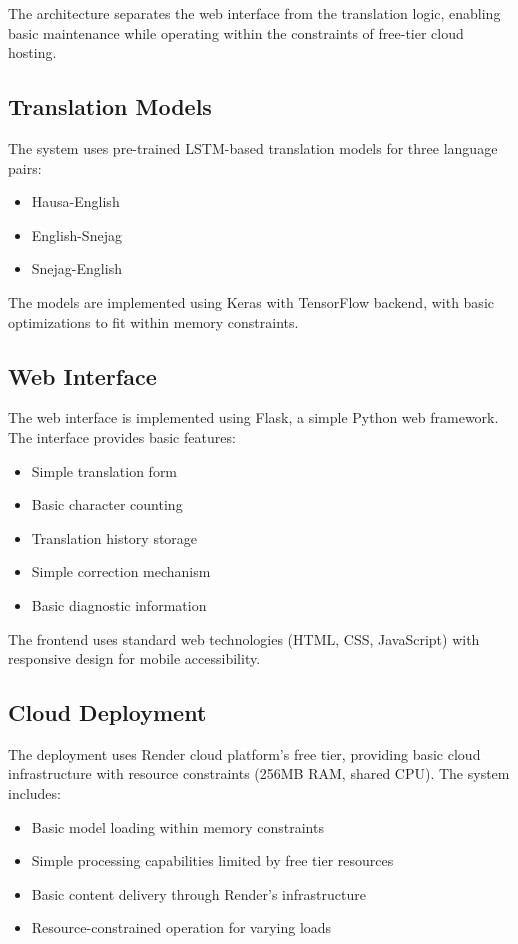 \documentclass[conference]{IEEEtran}
\begin{document}
The architecture separates the web interface from the translation logic, enabling basic maintenance while operating within the constraints of free-tier cloud hosting.

\subsection{Translation Models}

The system uses pre-trained LSTM-based translation models for three language pairs:

\begin{itemize}
    \item Hausa-English
    \item English-Snejag
    \item Snejag-English
\end{itemize}

The models are implemented using Keras with TensorFlow backend, with basic optimizations to fit within memory constraints.

\subsection{Web Interface}

The web interface is implemented using Flask, a simple Python web framework. The interface provides basic features:

\begin{itemize}
    \item Simple translation form
    \item Basic character counting
    \item Translation history storage
    \item Simple correction mechanism
    \item Basic diagnostic information
\end{itemize}

The frontend uses standard web technologies (HTML, CSS, JavaScript) with responsive design for mobile accessibility.

\subsection{Cloud Deployment}

The deployment uses Render cloud platform's free tier, providing basic cloud infrastructure with resource constraints (256MB RAM, shared CPU). The system includes:

\begin{itemize}
    \item Basic model loading within memory constraints
    \item Simple processing capabilities limited by free tier resources
    \item Basic content delivery through Render's infrastructure
    \item Resource-constrained operation for varying loads
\end{itemize}
\end{document}
